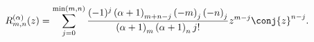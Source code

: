 \[\mathop{R^{(\alpha)}_{m,n}\/}\nolimits\!\left(z\right)=\sum_{j=0}^{\min(m,n)}%
\frac{(-1)^{j}\left(\alpha+1\right)_{m+n-j}\left(-m\right)_{j}\left(-n\right)_%
{j}}{\left(\alpha+1\right)_{m}\left(\alpha+1\right)_{n}j!}\*z^{m-j}\*\conj{z}^%
{n-j}.\]